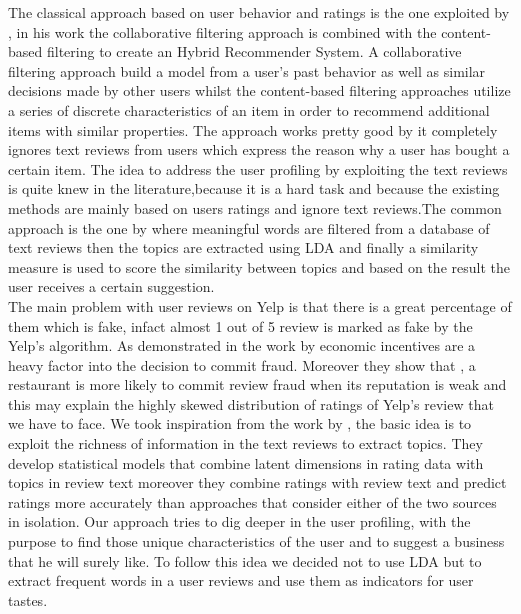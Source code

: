 \documentclass[11pt]{article}
\begin{document}
The classical approach based on user behavior and ratings is the one exploited by \cite{Nikulin}, in his work the collaborative filtering approach is combined with the content-based filtering to create an Hybrid Recommender System. A collaborative filtering approach build a model from a user's
past behavior as well as similar decisions made by
other users whilst the content-based filtering approaches
utilize a series of discrete characteristics of an item in order to recommend
additional items with similar properties. The approach works pretty good by it completely ignores text reviews from users which express the reason why a user has bought a certain item.
The idea to address the user profiling by exploiting the text reviews is quite knew in the literature,because it is a hard task and because the existing methods are mainly based on users ratings and ignore text reviews.The common approach is the one by \cite{Dupuy} where meaningful words are filtered from a database of text reviews then the topics are extracted using LDA and finally a similarity measure is used to score the similarity between topics and based on the result the user receives a certain suggestion.\\
The main problem with user reviews on Yelp is that there is a great percentage of them which is fake, infact almost 1 out of 5 review is marked as fake by the Yelp's algorithm. As demonstrated in the work by \cite{Luca} economic incentives are a heavy factor into the decision to commit fraud. Moreover they show that , a restaurant
is more likely to commit review fraud when its reputation is weak and this may explain the highly skewed distribution of ratings of Yelp's review that we have to face.
We took inspiration from the work by \cite{McAuley}, the basic idea is to exploit the richness of information in the text reviews to extract topics. They develop statistical models that combine
latent dimensions in rating data with topics in review text moreover they combine ratings with review text and predict
ratings more accurately than approaches that consider either of the
two sources in isolation.
Our approach tries to dig deeper in the user profiling, with the purpose to find those unique characteristics of the user and to suggest a business that he will surely like. To follow this idea we decided not to use LDA but to extract frequent words in a  user reviews and use them as indicators for user tastes.\\
\end{document}

